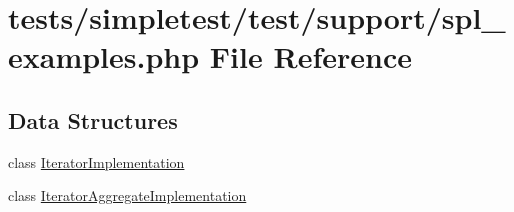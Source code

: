 \hypertarget{spl__examples_8php}{\section{tests/simpletest/test/support/spl\-\_\-examples.php File Reference}
\label{spl__examples_8php}
}
\subsection*{Data Structures}
\begin{DoxyCompactItemize}
\item 
class \hyperlink{class_iterator_implementation}{Iterator\-Implementation}
\item 
class \hyperlink{class_iterator_aggregate_implementation}{Iterator\-Aggregate\-Implementation}
\end{DoxyCompactItemize}

